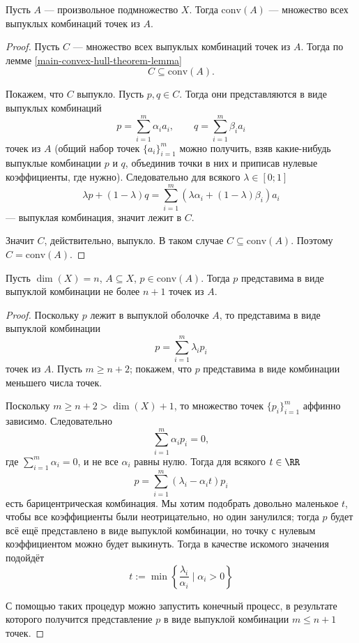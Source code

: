 \documentclass[12pt,a4paper]{article}
\newcommand{\conv}{\ensuremath{\mathrm{conv}}\xspace}
\begin{document}
    \begin{theorem}
        Пусть $A$ --- произвольное подмножество $X$. Тогда $\conv(A)$ --- множество всех выпуклых комбинаций точек из $A$.
    \end{theorem}

    \begin{proof}
        Пусть $C$ --- множество всех выпуклых комбинаций точек из $A$. Тогда по лемме \ref{main-convex-hull-theorem-lemma}
        \[C \subseteq \conv(A).\]
        
        Покажем, что $C$ выпукло. Пусть $p, q \in C$. Тогда они представляются в виде выпуклых комбинаций
        \[
            p = \sum_{i=1}^m \alpha_i a_i,
            \qquad
            q = \sum_{i=1}^m \beta_i a_i
        \]
        точек из $A$ (общий набор точек $\{a_i\}_{i=1}^m$ можно получить, взяв какие-нибудь выпуклые комбинации $p$ и $q$, объединив точки в них и приписав нулевые коэффициенты, где нужно). Следовательно для всякого $\lambda \in [0; 1]$
        \[\lambda p + (1 - \lambda) q = \sum_{i=1}^m (\lambda \alpha_i + (1 - \lambda) \beta_i) a_i\]
        --- выпуклая комбинация, значит лежит в $C$.
        
        Значит $C$, действительно, выпукло. В таком случае $C \subseteq \conv(A)$. Поэтому $C = \conv(A)$.
    \end{proof}

    \begin{theorem}[Каратеодори]\label{Caratheodory-theorem}
        Пусть $\dim(X) = n$, $A \subseteq X$, $p \in \conv(A)$. Тогда $p$ представима в виде выпуклой комбинации не более $n+1$ точек из $A$.
    \end{theorem}

    \begin{proof}
        Поскольку $p$ лежит в выпуклой оболочке $A$, то представима в виде выпуклой комбинации
        \[p = \sum_{i=1}^m \lambda_i p_i\]
        точек из $A$. Пусть $m \geqslant n+2$; покажем, что $p$ представима в виде комбинации меньшего числа точек.

        Поскольку $m \geqslant n + 2 > \dim(X) + 1$, то множество точек $\{p_i\}_{i=1}^m$ аффинно зависимо. Следовательно
        \[\sum_{i=1}^m \alpha_i p_i = 0,\]
        где $\sum_{i=1}^m \alpha_i = 0$, и не все $\alpha_i$ равны нулю. Тогда для всякого $t \in \RR$
        \[p = \sum_{i=1}^m (\lambda_i - \alpha_i t) p_i\]
        есть барицентрическая комбинация. Мы хотим подобрать довольно маленькое $t$, чтобы все коэффициенты были неотрицательно, но один занулился; тогда $p$ будет всё ещё представлено в виде выпуклой комбинации, но точку с нулевым коэффициентом можно будет выкинуть. Тогда в качестве искомого значения подойдёт
        \[t := \min \left\{\frac{\lambda_i}{\alpha_i} \mid \alpha_i > 0\right\}\]

        С помощью таких процедур можно запустить конечный процесс, в результате которого получится представление $p$ в виде выпуклой комбинации $m \leqslant n+1$ точек.
    \end{proof}
\end{document}
